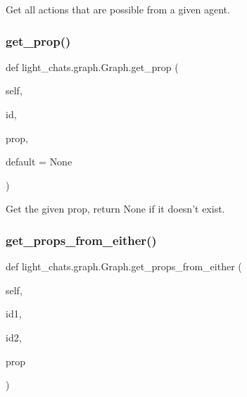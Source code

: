 \begin{DoxyVerb}Get all actions that are possible from a given agent.
\end{DoxyVerb}
 \mbox{\label{classlight__chats_1_1graph_1_1Graph_a30483d3bbb88924bb7b98fb72b2e23fe}} 
\subsubsection{\texorpdfstring{get\+\_\+prop()}{get\_prop()}}
{\footnotesize\ttfamily def light\+\_\+chats.\+graph.\+Graph.\+get\+\_\+prop (\begin{DoxyParamCaption}\item[{}]{self,  }\item[{}]{id,  }\item[{}]{prop,  }\item[{}]{default = {\ttfamily None} }\end{DoxyParamCaption})}

\begin{DoxyVerb}Get the given prop, return None if it doesn't exist.
\end{DoxyVerb}
 \mbox{\label{classlight__chats_1_1graph_1_1Graph_ad12090e48ff11063ece35c115b91d2aa}} 
\subsubsection{\texorpdfstring{get\+\_\+props\+\_\+from\+\_\+either()}{get\_props\_from\_either()}}
{\footnotesize\ttfamily def light\+\_\+chats.\+graph.\+Graph.\+get\+\_\+props\+\_\+from\+\_\+either (\begin{DoxyParamCaption}\item[{}]{self,  }\item[{}]{id1,  }\item[{}]{id2,  }\item[{}]{prop }\end{DoxyParamCaption})}

